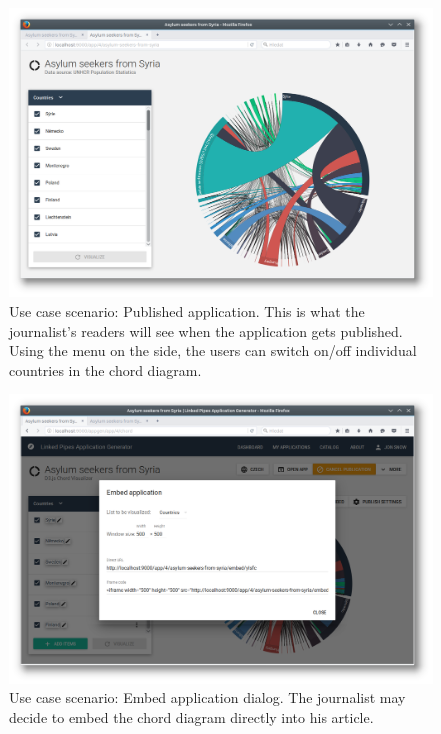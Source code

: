 \begin{figure}
	\centering
	\includegraphics[width=145mm]{img/05_scenario_09_published_app}
	\caption{Use case scenario: Published application. This is what the journalist's readers will see when the application gets published. Using the menu on the side, the users can switch on/off individual countries in the chord diagram.}
    \label{fig:scenario-09-published-app}
\end{figure}

\begin{figure}
	\centering
	\includegraphics[width=145mm]{img/05_scenario_10_embed_application}
	\caption{Use case scenario: Embed application dialog. The journalist may decide to embed the chord diagram directly into his article.}
    \label{fig:scenario-10-embed-application}
\end{figure}

